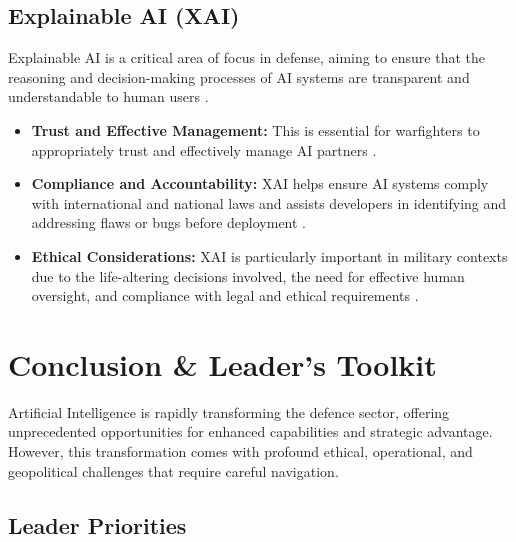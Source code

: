 \subsection{Explainable AI (XAI)}
Explainable AI is a critical area of focus in defense, aiming to ensure that the reasoning and decision-making processes of AI systems are transparent and understandable to human users \cite{ORFL_XAI, UWaterloo_XAI}.
\begin{itemize}
    \item \textbf{Trust and Effective Management:} This is essential for warfighters to appropriately trust and effectively manage AI partners \cite{ORFL_XAI}.
    \item \textbf{Compliance and Accountability:} XAI helps ensure AI systems comply with international and national laws and assists developers in identifying and addressing flaws or bugs before deployment \cite{UWaterloo_XAI}.
    \item \textbf{Ethical Considerations:} XAI is particularly important in military contexts due to the life-altering decisions involved, the need for effective human oversight, and compliance with legal and ethical requirements \cite{UWaterloo_XAI}.
\end{itemize}

\section{Conclusion \& Leader's Toolkit}

Artificial Intelligence is rapidly transforming the defence sector, offering unprecedented opportunities for enhanced capabilities and strategic advantage. However, this transformation comes with profound ethical, operational, and geopolitical challenges that require careful navigation.

\subsection{Leader Priorities}

